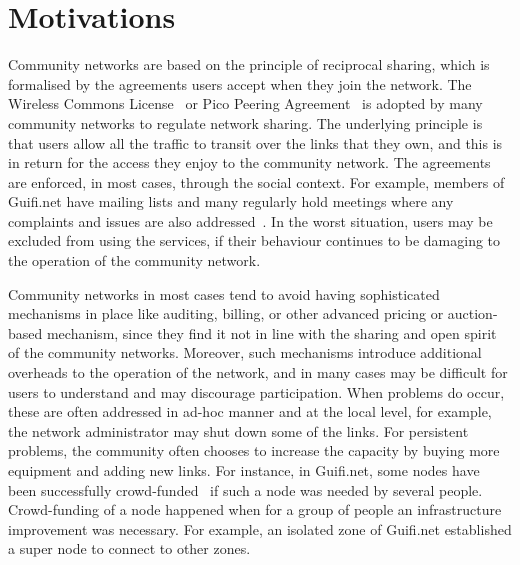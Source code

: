 
\section{Motivations}
\label{sec__incentvives_motivation}

Community networks are based on the principle of reciprocal sharing, 
which is formalised by the agreements users accept when they join the network.
The Wireless Commons License~\cite{WCL2010} or Pico Peering Agreement~\cite{PicoPeering2005} 
is adopted by many community networks to regulate network sharing. 
The underlying principle is that users allow all the traffic to transit over the links that they own,
and this is in return for the access they enjoy to the community network.
The agreements are enforced, in most cases, through the social context.
For example, members of Guifi.net have mailing lists and many regularly hold meetings where any complaints 
and issues are also addressed~\cite{Baig2015Guifi}.
In the worst situation, users may be excluded from using the services, if their behaviour continues to
be damaging to the operation of the community network.

Community networks in most cases tend to avoid having sophisticated mechanisms in place like auditing, billing, 
or other advanced pricing or auction-based mechanism, 
since they find it not in line with the sharing and open spirit of the community networks. %
Moreover, such mechanisms introduce additional overheads to the operation of the network,
and in many cases may be difficult for users to understand and may discourage participation.
When problems do occur, these are often addressed in ad-hoc manner and at the local level, 
for example, the network administrator may shut down some of the links.
For persistent problems, the community often chooses to increase the capacity by buying more equipment and adding new links.
For instance, in Guifi.net, some nodes have been successfully crowd-funded~\cite{Baig2015Guifi} if such a node was needed by several people. 
Crowd-funding of a node happened when for a group of people an infrastructure improvement was necessary. 
For example, an isolated zone of Guifi.net established a super node to connect to other zones. 

